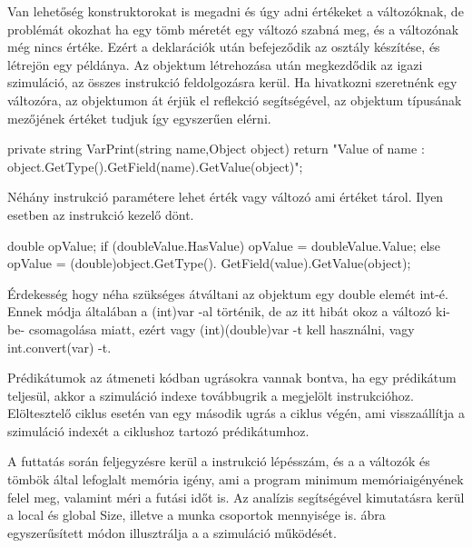 Van lehetőség konstruktorokat is megadni és úgy adni értékeket a változóknak, de problémát okozhat ha egy tömb méretét egy változó szabná meg, és a változónak még nincs értéke. Ezért a deklarációk után befejeződik az osztály készítése, és létrejön egy példánya.
Az objektum létrehozása után megkezdődik az igazi szimuláció, az összes instrukció feldolgozásra kerül. Ha hivatkozni szeretnénk egy változóra, az objektumon át érjük el reflekció segítségével, az objektum típusának mezőjének értéket tudjuk így egyszerűen elérni.

\begin{cpp}
private string VarPrint(string name,Object object)
        {
            return "Value of {name} : 
            {object.GetType().GetField(name).GetValue(object)}";
        }
\end{cpp}

Néhány instrukció paramétere lehet érték vagy változó ami értéket tárol. Ilyen esetben az instrukció kezelő dönt.

\begin{cpp}
			double opValue;
            if (doubleValue.HasValue)
            {
                opValue = doubleValue.Value;
            }
            else
            {
                opValue = (double)object.GetType().
                GetField(value).GetValue(object);
            }
\end{cpp}

Érdekesség hogy néha szükséges átváltani az objektum egy double elemét int-é. Ennek módja általában a (int)var -al történik, de az itt hibát okoz a változó ki-be- csomagolása miatt, ezért vagy (int)(double)var -t kell használni, vagy int.convert(var) -t.

Prédikátumok az átmeneti kódban ugrásokra vannak bontva, ha egy prédikátum teljesül, akkor a szimuláció indexe továbbugrik a megjelölt instrukcióhoz. Elöltesztelő ciklus esetén van egy második ugrás a ciklus végén, ami visszaállítja a szimuláció indexét a ciklushoz tartozó prédikátumhoz.

A futtatás során feljegyzésre kerül a instrukció lépésszám, és a a változók és tömbök által lefoglalt memória igény, ami a program minimum memóriaigényének felel meg, valamint méri a futási időt is. Az analízis segítségével kimutatásra kerül a local és global Size, illetve a munka csoportok mennyisége is.  ábra egyszerűsített módon illusztrálja a a szimuláció működését.

